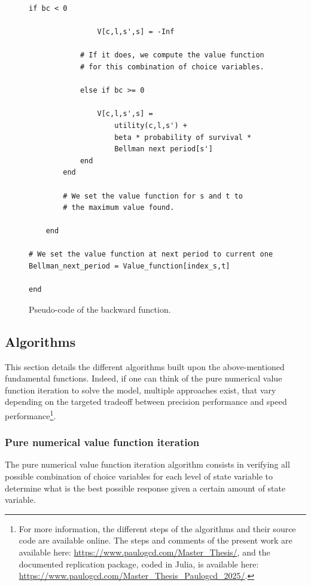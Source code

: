 \documentclass{article}
\begin{document}
\begin{itemize}
\begin{figure}[H]
\begin{lstlisting}[basicstyle=\small]
            if bc < 0

                V[c,l,s',s] = -Inf 
            
            # If it does, we compute the value function 
            # for this combination of choice variables.
            
            else if bc >= 0

                V[c,l,s',s] =
                    utility(c,l,s') +
                    beta * probability of survival *
                    Bellman next period[s']
            end
        end
        
        # We set the value function for s and t to
        # the maximum value found.
        
    end

# We set the value function at next period to current one
Bellman_next_period = Value_function[index_s,t]

end
\end{lstlisting}
\caption{Pseudo-code of the backward function.}
\end{figure}

\end{itemize}


\subsection{Algorithms}

This section details the different algorithms
built upon the above-mentioned fundamental functions.
Indeed, if one can think of the pure numerical value function iteration to solve 
the model, multiple approaches exist, that vary depending on the targeted tradeoff 
between precision performance and speed performance\footnote{For more information, the different steps of the algorithms and their source code are available online.
The steps and comments of the present work are available here: \url{https://www.paulogcd.com/Master_Thesis/},
and the documented replication package, coded in Julia, is available here: \url{https://www.paulogcd.com/Master_Thesis_Paulogcd_2025/}.}. 

\subsubsection{Pure numerical value function iteration}

The pure numerical value function iteration algorithm consists
in verifying all possible 
combination of choice variables for each level of state variable 
to determine what is the best possible response given a certain
amount of state variable.
\end{document}
